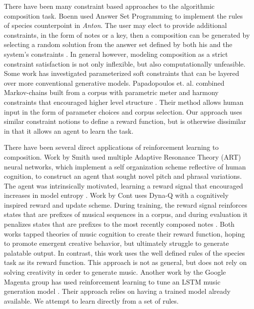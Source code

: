 \documentclass{article}
\begin{document}
 	There have been many constraint based approaches to the algorithmic composition task. Boenn used Answer Set Programming to implement the rules of species counterpoint in \textit{Anton}. The user may elect to provide additional constraints, in the form of notes or a key, then a composition can be generated by selecting a random solution from the answer set defined by both his and the system's constraints \cite{Boenn2008}. In general however, modeling composition as a strict constraint satisfaction is not only inflexible, but also computationally unfeasible. Some work has investigated parameterized soft constraints that can be layered over more conventional generative models. Papadopoulos et. al. combined Markov-chains built from a corpus with parametric meter and harmony constraints that encouraged higher level structure \cite{Papadopoulos2016}. Their method allows human input in the form of parameter choices and corpus selection. Our approach uses similar constraint notions to define a reward function, but is otherwise dissimilar in that it allows an agent to learn the task.
    
    There have been several direct applications of reinforcement learning to composition. Work by Smith used multiple Adaptive Resonance Theory (ART) neural networks, which implement a self organization scheme reflective of human cognition, to construct an agent that sought novel pitch and phrasal variations. The agent was intrinsically motivated, learning a reward signal that encouraged increases in model entropy \cite{Smith2012}. Work by Cont uses Dyna-Q with a cognitively inspired reward and update scheme. During training, the reward signal reinforces states that are prefixes of musical sequences in a corpus, and during evaluation it penalizes states that are prefixes to the most recently composed notes \cite{Cont2007}. Both works tapped theories of music cognition to create their reward function, hoping to promote emergent creative behavior, but ultimately struggle to generate palatable output. In contrast, this work uses the well defined rules of the species task as its reward function. This approach is not as general, but does not rely on solving creativity in order to generate music. Another work by the Google Magenta group has used reinforcement learning to tune an LSTM music generation model \cite{Jaques2016}. Their approach relies on having a trained model already available. We attempt to learn directly from a set of rules.
\end{document}
